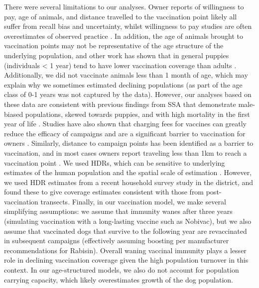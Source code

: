 \documentclass[tropicalmed,article,submit,moreauthors,pdftex]{mdpi}
\begin{document}
There were several limitations to our analyses. Owner reports of
willingness to pay, age of animals, and distance travelled to the
vaccination point likely all suffer from recall bias and uncertainty,
whilst willingness to pay studies are often overestimates of observed
practice \citep{birhane2016}. In addition, the age of animals brought to
vaccination points may not be representative of the age structure of the
underlying population, and other work has shown that in general puppies
(individuals \textless{} 1 year) tend to have lower vaccination coverage
than adults
\citep{arief2016, sanchez-soriano2020, mazeri2019, minyoo2015}.
Additionally, we did not vaccinate animals less than 1 month of age,
which may explain why we sometimes estimated declining populations (as
part of the age class of 0-1 years was not captured by the data).
However, our analyses based on these data are consistent with previous
findings from SSA that demonstrate male-biased populations, skewed
towards puppies, and with high mortality in the first year of life
\citep{czupryna2016, taylor2017}. Studies have also shown that charging
fees for vaccines can greatly reduce the efficacy of campaigns and are a
significant barrier to vaccination for owners
\citep{schildecker2016, yoak2021, barbosacosta2020}. Similarly, distance
to campaign points has been identified as a barrier to vaccination, and
in most cases owners report traveling less than 1km to reach a
vaccination point \citep{mazeri2018barriers, mazeri2019}. We used HDRs,
which can be sensitive to underlying estimates of the human population
and the spatial scale of estimation
\citep{sambo2018estimating, sambo2017}. However, we used HDR estimates
from a recent household survey study in the district, and found these to
give coverage estimates consistent with those from post-vaccination
transects. Finally, in our vaccination model, we make several
simplifying assumptions: we assume that immunity wanes after three years
(simulating vaccination with a long-lasting vaccine such as Nobivac),
but we also assume that vaccinated dogs that survive to the following
year are revaccinated in subsequent campaigns (effectively assuming
boosting per manufacturer recommendations for Rabisin). Overall waning
vaccinal immunity plays a lesser role in declining vaccination coverage
given the high population turnover in this context. In our
age-structured models, we also do not account for population carrying
capacity, which likely overestimates growth of the dog population.
\end{document}
